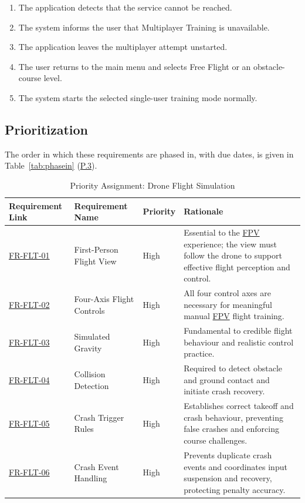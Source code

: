 \documentclass[12pt]{article}
\begin{document}
\begin{description}
\begin{itemize}
\begin{enumerate}
\item The application detects that the service cannot be reached.
\item The system informs the user that Multiplayer Training is unavailable.
\item The application leaves the multiplayer attempt unstarted.
\item The user returns to the main menu and selects Free Flight or an
obstacle-course level.
\item The system starts the selected single-user training mode normally.
\end{enumerate}
\end{itemize}
\end{description}

\subsection{Prioritization}\label{s5}


The order in which these requirements are phased in, with due dates, is given
in Table~\ref{tab:phasein} (\hyperref[p3]{P.3}).


\begin{table}[htbp]
\centering
\small
\caption{Priority Assignment: Drone Flight Simulation}
\label{tab:priority-flight}
\begin{tabular}{p{2.1cm} p{2.7cm} p{1.3cm} p{7.0cm}}
\hline
\textbf{Requirement Link} & \textbf{Requirement Name} & \textbf{Priority} & \textbf{Rationale} \\
\hline
\hyperref[sec:s2-flight]{FR-FLT-01} & First-Person Flight View & High & Essential to the \hyperlink{glos:FPV}{FPV} experience; the view must follow the drone to support effective flight perception and control. \\
\hyperref[sec:s2-flight]{FR-FLT-02} & Four-Axis Flight Controls & High & All four control axes are necessary for meaningful manual \hyperlink{glos:FPV}{FPV} flight training. \\
\hyperref[sec:s2-flight]{FR-FLT-03} & Simulated Gravity & High & Fundamental to credible flight behaviour and realistic control practice. \\
\hyperref[sec:s2-flight]{FR-FLT-04} & Collision Detection & High & Required to detect obstacle and ground contact and initiate crash recovery. \\
\hyperref[sec:s2-flight]{FR-FLT-05} & Crash Trigger Rules & High & Establishes correct takeoff and crash behaviour, preventing false crashes and enforcing course challenges. \\
\hyperref[sec:s2-flight]{FR-FLT-06} & Crash Event Handling & High & Prevents duplicate crash events and coordinates input suspension and recovery, protecting penalty accuracy. \\
\hline
\end{tabular}
\end{table}
\end{document}
